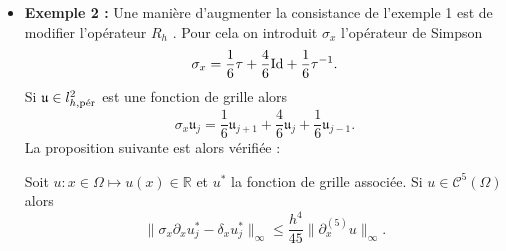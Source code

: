 \begin{itemize}
\item \textbf{Exemple 2 :} Une manière d'augmenter la consistance de l'exemple 1 est de modifier l'opérateur $R_h$ \cite{Collatz2012}. Pour cela on introduit $\sigma_x$ l'opérateur de Simpson
\begin{equation}
\sigma_x = \dfrac{1}{6} \tau + \dfrac{4}{6} \Id + \dfrac{1}{6} \tau^{-1}.
\end{equation}
Si $\mathfrak{u} \in l^2_{h,\per}$ est une fonction de grille alors
\begin{equation}
\sigma_x \mathfrak{u}_j = \dfrac{1}{6} \mathfrak{u}_{j+1} + \dfrac{4}{6} \mathfrak{u}_j + \dfrac{1}{6} \mathfrak{u}_{j-1} .
\end{equation}
La proposition suivante est alors vérifiée :
\begin{proposition}
Soit $u : x \in \Omega \mapsto u(x) \in \mathbb{R}$ et $u^*$ la fonction de grille associée. Si $u \in \mathcal{C}^5(\Omega)$ alors 
\begin{equation}
\| \sigma_x \partial_x u^*_j - \delta_x u^*_j \|_{\infty} \leq \dfrac{h^4}{45} \| \partial_x^{(5)} u \|_{\infty}.
\end{equation}
\label{prop:eq_deltax2_sigmax}
\end{proposition}


\end{itemize}
